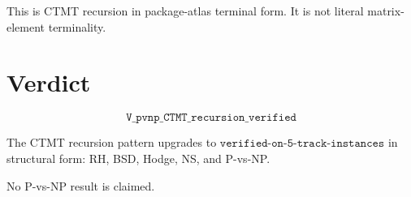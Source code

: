 \documentclass{article}
\begin{document}
This is CTMT recursion in package-atlas terminal form. It is not literal matrix-element terminality.

\section{Verdict}

\[
\boxed{\texttt{V\_pvnp\_CTMT\_recursion\_verified}}
\]

The CTMT recursion pattern upgrades to \(\texttt{verified-on-5-track-instances}\) in structural form: RH, BSD, Hodge, NS, and P-vs-NP.

No P-vs-NP result is claimed.
\end{document}
